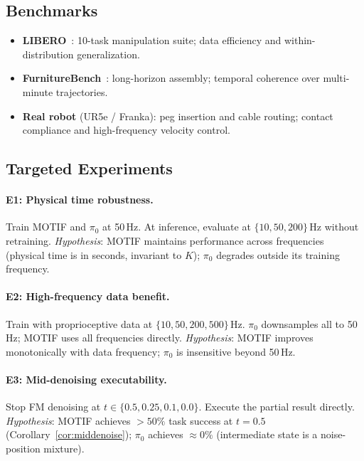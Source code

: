 \documentclass[11pt]{article}
\theoremstyle{plain}
\theoremstyle{definition}
\newcommand{\tdiff}{t}
\begin{document}
\subsection{Benchmarks}

\begin{itemize}[leftmargin=2em,noitemsep]
  \item \textbf{LIBERO}~\cite{liu2023libero}: 10-task manipulation suite;
    data efficiency and within-distribution generalization.
  \item \textbf{FurnitureBench}~\cite{heo2023furniturebench}: long-horizon
    assembly; temporal coherence over multi-minute trajectories.
  \item \textbf{Real robot} (UR5e / Franka): peg insertion and cable routing;
    contact compliance and high-frequency velocity control.
\end{itemize}

\subsection{Targeted Experiments}

\paragraph{E1: Physical time robustness.}
Train MOTIF and $\pi_0$ at 50\,Hz.
At inference, evaluate at $\{10, 50, 200\}$\,Hz without retraining.
\textit{Hypothesis}: MOTIF maintains performance across frequencies
(physical time is in seconds, invariant to $K$);
$\pi_0$ degrades outside its training frequency.

\paragraph{E2: High-frequency data benefit.}
Train with proprioceptive data at $\{10, 50, 200, 500\}$\,Hz.
$\pi_0$ downsamples all to 50\,Hz; MOTIF uses all frequencies directly.
\textit{Hypothesis}: MOTIF improves monotonically with data frequency;
$\pi_0$ is insensitive beyond 50\,Hz.

\paragraph{E3: Mid-denoising executability.}
Stop FM denoising at $\tdiff \in \{0.5, 0.25, 0.1, 0.0\}$.
Execute the partial result directly.
\textit{Hypothesis}: MOTIF achieves $> 50\%$ task success at $\tdiff = 0.5$
(Corollary~\ref{cor:middenoise});
$\pi_0$ achieves $\approx 0\%$ (intermediate state is a noise-position mixture).
\end{document}
